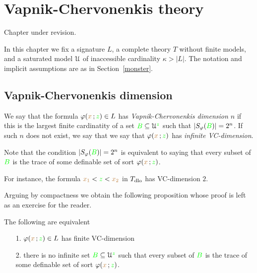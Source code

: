 \chapter{Vapnik-Chervonenkis theory}
\label{vc}


\noindent\llap{\textcolor{red}{\Large\warning}\kern1.5ex}\ignorespaces
Chapter under revision.

\def\medrel#1{\parbox[t]{6ex}{$\displaystyle\hfil #1$}}
\def\ceq#1#2#3{\parbox{20ex}{$\displaystyle #1$}\medrel{#2}$\displaystyle  #3$}

In this chapter we fix a signature $L$, a complete theory $T$ without finite models, and a saturated model $\EuScript U$ of inaccessible cardinality $\kappa>|L|$.
The notation and implicit assumptions are as in Section~\ref{monster}.

\section{Vapnik-Chervonenkis dimension}
\label{VCdim}

\def\ceq#1#2#3{\parbox{25ex}{$\displaystyle #1$}\medrel{#2}$\displaystyle  #3$}

We say that the formula $\varphi({\color{brown} x}\,;{\color{green} z})\in L$ has \emph{Vapnik-Chervonenkis dimension $n$\/} if this is the largest finite cardinatity of a set ${\color{green} B}\subseteq\EuScript U^{\color{green} z}$ such that $|S_\varphi({\color{green} B})|=2^n$. If such $n$ does not exist, we say that we say that  $\varphi({\color{brown} x}\,;{\color{green} z})$ has \emph{infinite VC-dimension}. 

Note that the condition $|S_\varphi({\color{green} B})|=2^n$ is equivalent to saying that every subset of ${\color{green} B}$ is the trace of some definable set of sort $\varphi({\color{brown} x}\,;{\color{green} z})$.

For instance, the formula ${\color{brown} x_1}<{\color{green} z}<{\color{brown} x_2}$ in $T_{\rm dlo}$ has VC-dimension $2$.

Arguing by compactness we obtain the following proposition whose proof is left as an exercise for the reader.

\begin{proposition}
The following are equivalent 
\begin{itemize}
\item[1.] $\varphi({\color{brown} x}\,;{\color{green} z})\in L$ has finite VC-dimension
\item[2.] there is no infinite set ${\color{green} B}\subseteq\EuScript U^{\color{green} z}$ such that every subset of ${\color{green} B}$ is the trace of some definable set of sort $\varphi({\color{brown} x}\,;{\color{green} z})$.
\end{itemize}
\end{proposition}

